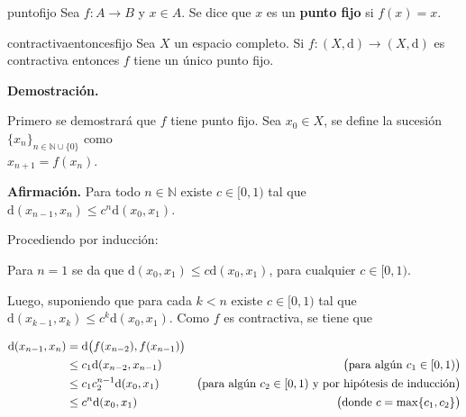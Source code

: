 \documentclass[12pt]{article}
\newenvironment{definicion}[1]{\begin{defi}[breakable, pad at break = 5mm, leftrule = 0.7mm, rightrule = 0.7mm, right = 2mm, left = 2mm, enlarge bottom finally by = 3mm]{}{#1}}{\end{defi}}
\newenvironment{ejercicio}[1]{\begin{ejer}[breakable, pad at break = 5mm, leftrule = 0.7mm, rightrule = 0.7mm, right = 2mm, left = 2mm, enlarge bottom finally by = 3mm, fontlower = \setlength{\parskip}{2mm}]{}{#1}}{\end{ejer}}
\newcommand{\nat}{\mathbb{N}}
\begin{document}

	\begin{definicion}{puntofijo}
		Sea $ f \colon A \to B $ y $ x \in A $. Se dice que $ x $ es un \textbf{punto fijo} si $ f(x) = x $.
	\end{definicion}


	\begin{ejercicio}{contractivaentoncesfijo}
		Sea $ X $ un espacio completo. Si $ f \colon (X, \mathrm{d}) \to (X, \mathrm{d}) $ es contractiva entonces $ f $ tiene un único punto fijo.

		\tcblower

		\textbf{Demostración.}

		Primero se demostrará que $ f $ tiene punto fijo. Sea $ x_0 \in X $, se define la sucesión $ \lbrace x_n \rbrace_{n \in \nat \cup \{0\}} $ como \\ $ x_{n+1} = f(x_n) $. 

		\textbf{Afirmación.} Para todo $ n \in \nat $ existe $ c \in [0,1) $ tal que $ \mathrm{d} (x_{n-1}, x_n) \leq c^n \mathrm{d} (x_0, x_1) $. 

		\hfill \begin{minipage}{0.98\linewidth}
			\setlength{\parskip}{1mm}

			Procediendo por inducción:

			Para $ n = 1 $ se da que $ \mathrm{d}(x_0, x_1) \leq c \mathrm{d}(x_0, x_1) $, para cualquier $ c \in [0,1) $.

			Luego, suponiendo que para cada $ k < n $ existe $ c \in [0,1) $ tal que $ \mathrm{d} (x_{k-1}, x_k) \leq c^k \mathrm{d} (x_0, x_1) $. Como $ f $ es contractiva, se tiene que

			\begin{align*}
				\mathrm{d} (x_{n-1}, x_n) &= \mathrm{d} \bigl( f(x_{n-2}), f(x_{n-1}) \bigr) & \\
				&\leq c_1 \mathrm{d} (x_{n-2}, x_{n-1}) & \bigl( \mbox{para algún $ c_1 \in [0,1) $} \bigr) \\
				&\leq c_1 c_2^{n-1} \mathrm{d} (x_0, x_1) & \bigl( \mbox{para algún $ c_2 \in [0,1) $ y por hipótesis de inducción} \bigr) \\
				&\leq c^n \mathrm{d} (x_0, x_1) & \bigl( \mbox{donde $ c = \max \{ c_1, c_2 \} $}\bigr)
			\end{align*}


\end{minipage}
\end{ejercicio}
\end{document}
